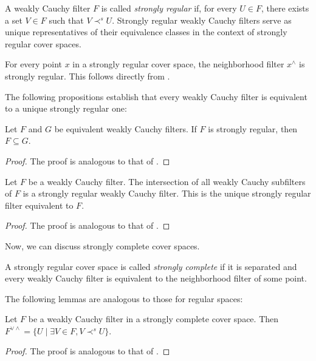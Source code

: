 \documentclass[reqno]{amsart}
\theoremstyle{definition}
\theoremstyle{remark}
\numberwithin{figure}{section}
\newcommand{\rb}{\prec}
\begin{document}
A weakly Cauchy filter $F$ is called \emph{strongly regular} if, for every $U \in F$, there exists a set $V \in F$ such that $V \rb^s U$.
Strongly regular weakly Cauchy filters serve as unique representatives of their equivalence classes in the context of strongly regular cover spaces.

\begin{example}
For every point $x$ in a strongly regular cover space, the neighborhood filter $x^\wedge$ is strongly regular.
This follows directly from .
\end{example}

The following propositions establish that every weakly Cauchy filter is equivalent to a unique strongly regular one:

\begin{prop}
Let $F$ and $G$ be equivalent weakly Cauchy filters.
If $F$ is strongly regular, then $F \subseteq G$.
\end{prop}
\begin{proof}
The proof is analogous to that of .
\end{proof}

\begin{prop}
Let $F$ be a weakly Cauchy filter.
The intersection of all weakly Cauchy subfilters of $F$ is a strongly regular weakly Cauchy filter.
This is the unique strongly regular filter equivalent to $F$.
\end{prop}
\begin{proof}
The proof is analogous to that of .
\end{proof}

Now, we can discuss strongly complete cover spaces.

\begin{defn}
A strongly regular cover space is called \emph{strongly complete} if it is separated and every weakly Cauchy filter is equivalent to the neighborhood filter of some point.
\end{defn}

The following lemmas are analogous to those for regular spaces:

\begin{lem}
Let $F$ be a weakly Cauchy filter in a strongly complete cover space.
Then $F^{\vee \wedge} = \{ U \mid \exists V \in F, V \rb^s U \}$.
\end{lem}
\begin{proof}
The proof is analogous to that of .
\end{proof}
\end{document}
